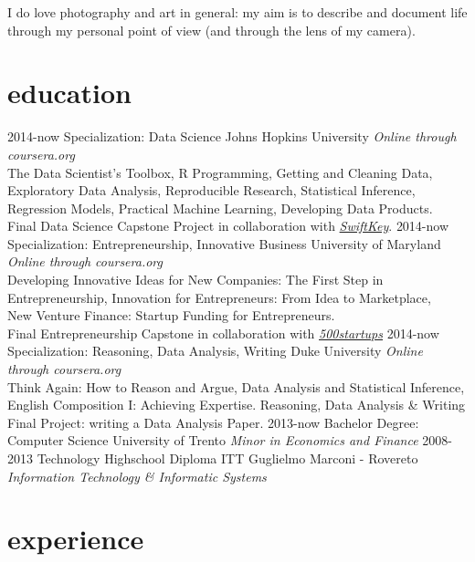 \documentclass[]{friggeri-cv}
\begin{document}
I do love photography and art in general: my aim is to describe and document life through my personal point of view (and through the lens of my camera).

\section{education}

\begin{entrylist}
  \entry
    {2014-now}
    {Specialization: Data Science}
    {Johns Hopkins University}
    {\emph{Online through coursera.org}\\
    The Data Scientist’s Toolbox, R Programming, Getting and Cleaning Data, \\Exploratory Data Analysis, Reproducible Research, Statistical Inference, \\Regression Models, Practical Machine Learning, Developing Data Products.\\
    Final Data Science Capstone Project in collaboration with \emph{\href{http://swiftkey.com/it/}{SwiftKey}}.
    }
\entry
    {2014-now}
    {Specialization: Entrepreneurship, Innovative Business}
    {University of Maryland}
    {\emph{Online through coursera.org}\\
    Developing Innovative Ideas for New Companies: The First Step in Entrepreneurship, Innovation for Entrepreneurs: From Idea to Marketplace,\\ New Venture Finance: Startup Funding for Entrepreneurs. \\
    Final Entrepreneurship Capstone in collaboration with \emph{\href{http://500.co/startups}{500startups}}
    }
\entry
    {2014-now}
    {Specialization: Reasoning, Data Analysis, Writing}
    {Duke University}
    {\emph{Online through coursera.org}\\
    Think Again: How to Reason and Argue, Data Analysis and Statistical Inference, English Composition I: Achieving Expertise. Reasoning, Data Analysis \& Writing Final Project: writing a Data Analysis Paper.
    }
\entry
    {2013-now}
    {Bachelor Degree: Computer Science}
    {University of Trento}
    {\emph{Minor in Economics and Finance}}
\entry
    {2008-2013}
    {Technology Highschool Diploma}
    {ITT Guglielmo Marconi - Rovereto}
    {\emph{Information Technology \& Informatic Systems}}

\end{entrylist}

\section{experience}
\end{document}
